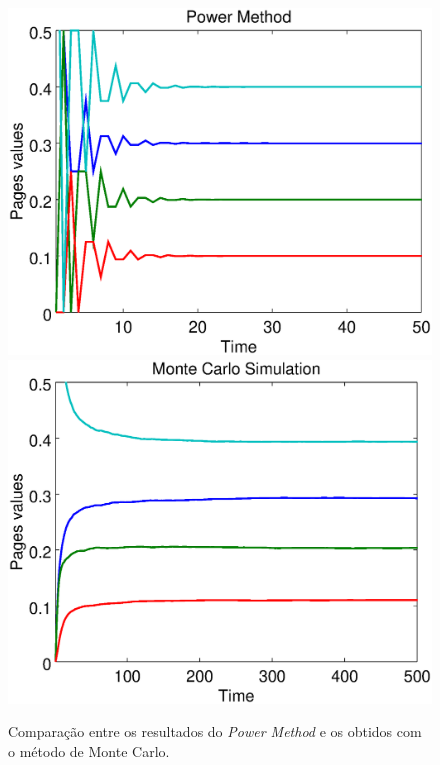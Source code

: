 \
\begin{figure}[!htb]
	\centering
	\includegraphics[scale=0.35]{imagens/powermethod}
	\hspace{0.1cm}
	\includegraphics[scale=0.35]{imagens/montecarlo}
	\caption{Comparação entre os resultados do \textit{Power Method} e os obtidos com o método de Monte Carlo.}
	\label{powermonte}
\end{figure}